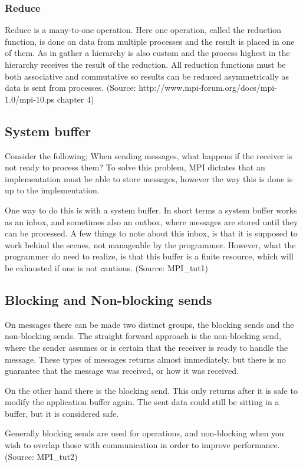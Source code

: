 \subsubsection{Reduce}
Reduce is a many-to-one operation. Here one operation, called the reduction function, is done on data from multiple processes and the result is placed in one of them. As in gather a hierarchy is also custom and the process highest in the hierarchy receives the result of the reduction. All reduction functions must be both associative and commutative so results can be reduced asymmetrically as data is sent from processes.
(Source: http://www.mpi-forum.org/docs/mpi-1.0/mpi-10.ps chapter 4)

\subsection{System buffer}
Consider the following; When sending messages, what happens if the receiver is not ready to process them? To solve this problem, MPI dictates that an implementation must be able to store messages, however the way this is done is up to the implementation.

One way to do this is with a system buffer. In short terms a system buffer works as an inbox, and sometimes also an outbox, where messages are stored until they can be processed. A few things to note about this inbox, is that it is supposed to work behind the scenes, not manageable by the programmer. However, what the programmer do need to realize, is that this buffer is a finite resource, which will be exhausted if one is not cautious.
(Source: MPI\_tut1)

\subsection{Blocking and Non-blocking sends}
On messages there can be made two distinct groups, the blocking sends and the non-blocking sends. The straight forward approach is the non-blocking send, where the sender assumes or is certain that the receiver is ready to handle the message. These types of messages returns almost immediately, but there is no guarantee that the message was received, or how it was received.

On the other hand there is the blocking send. This only returns after it is safe to modify the application buffer again. The sent data could still be sitting in a buffer, but it is considered safe.

Generally blocking sends are used for operations, and non-blocking when you wish to overlap those with communication in order to improve performance.
(Source: MPI\_tut2)

